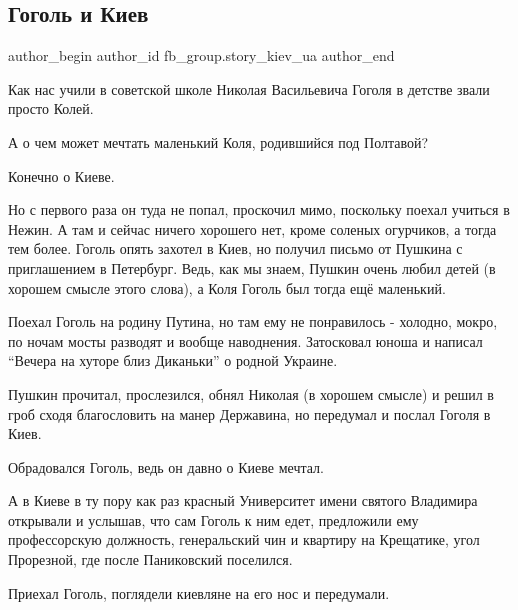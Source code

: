  
 
 
 
 
 
\subsection{Гоголь и Киев}
\label{sec:28_09_2021.fb.fb_group.story_kiev_ua.1.gogol_i_kiev}
 
\ifcmt
 author_begin
   author_id fb_group.story_kiev_ua
 author_end
\fi

Как нас учили в советской школе Николая Васильевича Гоголя в детстве звали
просто Колей.

А о чем может мечтать маленький Коля, родившийся под Полтавой?

Конечно о Киеве.

Но с первого раза он туда не попал, проскочил мимо, поскольку поехал учиться в
Нежин. А там и сейчас ничего хорошего нет, кроме соленых огурчиков, а тогда тем
более. Гоголь опять захотел в Киев, но получил письмо от Пушкина с приглашением
в Петербург. Ведь, как мы знаем, Пушкин очень любил детей (в хорошем смысле
этого слова), а Коля Гоголь был тогда ещё маленький. 

Поехал Гоголь на родину Путина, но там ему не понравилось - холодно, мокро, по
ночам мосты разводят и вообще наводнения. Затосковал юноша  и написал \enquote{Вечера
на хуторе близ Диканьки} о родной Украине. 

Пушкин прочитал, прослезился, обнял Николая (в хорошем смысле) и решил в гроб
сходя благословить на манер Державина, но передумал и послал Гоголя в   Киев.

Обрадовался Гоголь, ведь он давно о Киеве мечтал.

А в Киеве в ту пору как раз красный Университет имени святого Владимира
открывали и услышав, что сам Гоголь к ним едет, предложили ему профессорскую
должность, генеральский чин и квартиру на Крещатике, угол Прорезной, где после
Паниковский поселился.

Приехал Гоголь, поглядели киевляне на его нос и передумали.

